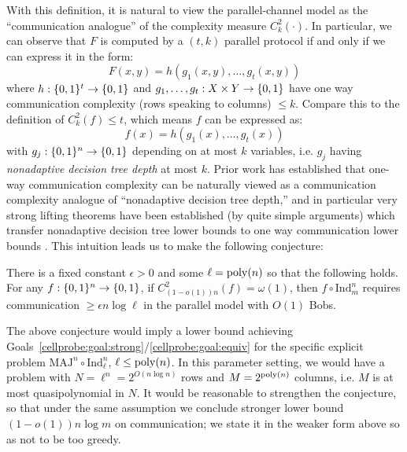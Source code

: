 With this definition, it is natural to view the parallel-channel model as the ``communication analogue'' of the complexity measure $C^2_k(\cdot)$. In particular, we can observe that $F$ is computed by a $(t,k)$ parallel protocol if and only if we can express it in the form:
\[
F(x,y) = h(g_1(x,y),\ldots,g_t(x,y))
\]
where $h: \{0,1\}^t \to \{0,1\}$ and $g_1,\ldots,g_t: X \times Y \to \{0,1\}$ have one way communication complexity (rows speaking to columns) $\leq k$. Compare this to the definition of $C^2_k(f) \leq t$, which means $f$ can be expressed as:
\[
f(x) = h(g_1(x),\ldots,g_t(x))
\]
with $g_j: \{0,1\}^n \to \{0,1\}$ depending on at most $k$ variables, i.e. $g_j$ having \emph{nonadaptive decision tree depth} at most $k$. Prior work has established that one-way communication complexity can be naturally viewed as a communication complexity analogue of ``nonadaptive decision tree depth,'' and in particular very strong lifting theorems have been established (by quite simple arguments) which transfer nonadaptive decision tree lower bounds to one way communication lower bounds \cite{oneway-lifting}.
This intuition leads us to make the following conjecture:
\begin{conjecture}\label{cellprobe:conj:lifting}
There is a fixed constant $\epsilon>0$ and some $\ell= \mathrm{poly}(n)$ so that the following holds. For any $f: \{0,1\}^n \to \{0,1\}$, if $C^2_{(1-o(1)) n }(f) = \omega(1)$, then $f \circ \mathrm{Ind}_m^n$ requires communication $\geq \epsilon n \log \ell$ in the parallel model with $O(1)$ Bobs.
\end{conjecture}
The above conjecture would imply a lower bound achieving Goals~\ref{cellprobe:goal:strong}/\ref{cellprobe:goal:equiv} for the specific explicit problem $\mathrm{MAJ}^n \circ \mathrm{Ind}_\ell^n$, $\ell \leq \mathrm{poly}(n)$. In this parameter setting, we would have a problem with $N = \ell^n = 2^{O(n\log n)}$ rows and $M = 2^{\mathrm{poly}(n)}$ columns, i.e. $M$ is at most quasipolynomial in $N$.
It would be reasonable to strengthen the conjecture, so that under the same assumption we conclude stronger lower bound $(1 - o(1))n\log m$ on communication; we state it in the weaker form above so as not to be too greedy.

